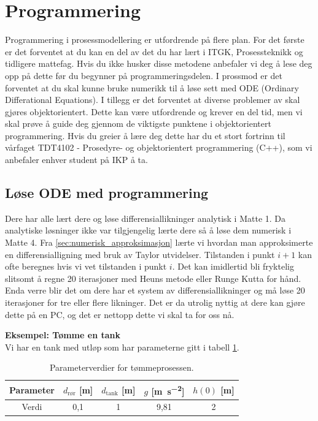 \clearpage
\section{Programmering}\label{sec:prog}
Programmering i prosessmodellering er utfordrende på flere plan. For det første er det forventet at du kan en del av det du har lært i ITGK, Prosessteknikk og tidligere mattefag. Hvis du ikke husker disse metodene anbefaler vi deg å lese deg opp på dette før du begynner på programmeringsdelen. I prossmod er det forventet at du skal kunne bruke numerikk til å løse sett med ODE (Ordinary Differational Equations). I tillegg er det forventet at diverse problemer av skal gjøres objektorientert. Dette kan være utfordrende og krever en del tid, men vi skal prøve å guide deg gjennom de viktigste punktene i objektorientert programmering. Hvis du greier å lære deg dette har du et stort fortrinn til vårfaget TDT4102 - Prosedyre- og objektorientert programmering (C++), som vi anbefaler enhver student på IKP å ta.

\subsection{Løse ODE med programmering}
 
 Dere har alle lært dere og løse differensiallikninger analytisk i Matte 1. Da analytiske løsninger ikke var tilgjengelig lærte dere så å løse dem numerisk i Matte 4. Fra \cref{sec:numerisk_approksimasjon} lærte vi hvordan man approksimerte en differensialligning med bruk av Taylor utvidelser. Tilstanden i punkt $i+1$ kan ofte beregnes hvis vi vet tilstanden i punkt $i$. Det kan imidlertid bli fryktelig slitsomt å regne 20 iterasjoner med Heuns metode eller Runge Kutta for hånd. Enda verre blir det om dere har et system av differensiallikninger og må løse 20 iterasjoner for tre eller flere likninger. Det er da utrolig nyttig at dere kan gjøre dette på en PC, og det er nettopp dette vi skal ta for oss nå.
\newpage

\textbf{Eksempel: Tømme en tank}\\
Vi har en tank med utløp som har parameterne gitt i tabell \cref{tab:tank_parameters}. 
\begin{table}[h]
    \centering
    \caption{Parameterverdier for tømmeprosessen.}
    \begin{tabular}{ccccc}
    \toprule
        Parameter & $d_\text{rør}$ [\si{\meter}] & $d_\text{tank}$ 
        [\si{\meter}] & $g$ [\si{\meter\per\square\second}] & $h(0)$ [\si{\meter}]\\
    \midrule
        Verdi       & 0,1 & 1 & 9,81 & 2\\
    \bottomrule
    \end{tabular}
    \label{tab:tank_parameters}
\end{table}

